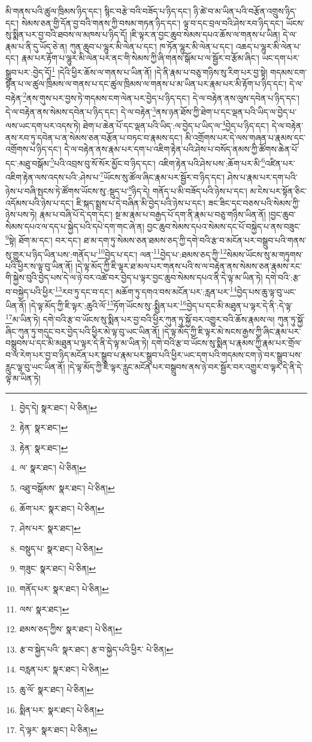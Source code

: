 མི་གནས་པའི་ཚུལ་ཁྲིམས་ཉིད་དང་། སྙིང་བརྩེ་བའི་བཟོད་པ་ཉིད་དང་། ཉི་ཚེ་བ་མ་ཡིན་པའི་བརྩོན་འགྲུས་ཉིད་དང་། སེམས་ཅན་གྱི་དོན་བྱ་བའི་གནས་ཀྱི་བསམ་གཏན་ཉིད་དང་། ལྟ་བ་དང་བྲལ་བའི་ཤེས་རབ་ཉིད་དང་། ཡོངས་སུ་སྨིན་པར་བྱ་བའི་ཐབས་ལ་མཁས་པ་ཉིད་དོ། །ཇི་ལྟར་ན་བྱང་ཆུབ་སེམས་དཔའ་ཆོས་ལ་གནས་པ་ཡིན། དེ་ལ་རྣམ་པ་ནི་དུ་ཡོད་ཅེ་ན། ཀུན་ཆུབ་པ་ལྷུར་མི་ལེན་པ་དང་། ཁ་ཏོན་ལྷུར་མི་ལེན་པ་དང་། འཆད་པ་ལྷུར་མི་ལེན་པ་དང་། རྣམ་པར་རྟོག་པ་ལྷུར་མི་ལེན་པར་ནང་གི་སེམས་ཀྱི་ཞི་གནས་སྒོམ་པ་ལ་སྦྱོར་བ་རྩོམ་ཞིང་། ཡང་དག་པར་སྒྲུབ་པར་:བྱེད་དོ།\footnote{བྱེད་དེ།  སྣར་ཐང་།  པེ་ཅིན། } །དེའི་ཕྱིར་ཆོས་ལ་གནས་པ་ཡིན་ནོ། །དེ་ནི་རྣམ་པ་བཅུ་གཉིས་སུ་རིག་པར་བྱ་སྟེ། གདམས་ངག་སྟོན་པ་ལ་ཚུལ་ཁྲིམས་ལ་གནས་པ་དང་ཚུལ་ཁྲིམས་ལ་གནས་པ་མ་ཡིན་པར་རྣམ་པར་མི་རྟོག་པ་ཉིད་དང་། དེ་ལ་བརྟེན་\footnote{རྟེན་  སྣར་ཐང་། }ནས་གུས་པར་བྱས་ཏེ་གདམས་ངག་ལེན་པར་བྱེད་པ་ཉིད་དང་། དེ་ལ་བརྟེན་ནས་ལུས་དབེན་པ་ཉིད་དང་། དེ་ལ་བརྟེན་ནས་སེམས་དབེན་པ་ཉིད་དང་། དེ་ལ་བརྟེན་\footnote{རྟེན་  སྣར་ཐང་། }ནས་ཉན་ཐོས་ཀྱི་ཐེག་པ་དང་ལྡན་པའི་ཡིད་ལ་བྱེད་པ་ལས་ཡང་དག་པར་འདས་ཏེ། ཐེག་པ་ཆེན་པོ་དང་ལྡན་པའི་ཡིད་:ལ་བྱེད་པ་ཡིད་ལ་\footnote{ལ་  སྣར་ཐང་།  པེ་ཅིན། }བྱེད་པ་ཉིད་དང་། དེ་ལ་བརྟེན་ནས་རབ་ཏུ་དབེན་པ་ན་སེམས་ཅན་བརྩོན་པ་བཏང་བ་རྣམས་དང་། མི་འགྲོགས་པར་དེ་ལས་གཞན་པ་རྣམས་དང་འགྲོགས་པ་ཉིད་དང་། དེ་ལ་བརྟེན་ནས་རྣམ་པར་དག་པ་འཇིག་རྟེན་པའི་ཤེས་པ་བསོད་ནམས་ཀྱི་ཚོགས་ཆེན་པོ་དང་:མཐུ་བསྒོམ་\footnote{འཐུ་བསྒོམས་  སྣར་ཐང་།  པེ་ཅིན། }པའི་འབྲས་བུ་སོ་སོར་མྱོང་བ་ཉིད་དང་། འཇིག་རྟེན་པའི་ཤེས་པས་:ཆོག་པར་མི་\footnote{ཆོག་པར་  སྣར་ཐང་།  པེ་ཅིན། }འཛིན་པར་འཇིག་རྟེན་ལས་འདས་པའི་:ཤེས་པ་\footnote{ཤེས་པར་  སྣར་ཐང་། }ཡོངས་སུ་ཚོལ་ཞིང་རྣམ་པར་སྦྱོར་བ་ཉིད་དང་། ཤེས་པ་རྣམ་པར་དག་པའི་ཉེས་པ་བཞི་སྤངས་ཏེ་ཚོགས་ཡོངས་སུ་:སྡུད་པ་\footnote{བསྡུད་པ་  སྣར་ཐང་།  པེ་ཅིན། }ཉིད་དེ། གནོད་པ་མི་བཟོད་པའི་ཉེས་པ་དང་། མ་ངེས་པར་སྟོན་ཅིང་འདོམས་པའི་ཉེས་པ་དང་། ཇི་སྐད་སྨྲས་པ་དེ་བཞིན་མི་བྱེད་པའི་ཉེས་པ་དང་། ཟང་ཟིང་དང་བཅས་པའི་སེམས་ཀྱི་ཉེས་པས་ཏེ། རྣམ་པ་བཞི་པོ་དེ་དག་དང་། སྔ་མ་རྣམ་པ་བརྒྱད་པོ་དག་ནི་རྣམ་པ་བཅུ་གཉིས་ཡིན་ནོ། །བྱང་ཆུབ་སེམས་དཔའ་ལ་དད་པ་སྐྱེད་པའི་དཔེ་དག་གང་ཞེ་ན། བྱང་ཆུབ་སེམས་དཔའ་སེམས་དང་པོ་བསྐྱེད་པ་ནས་བཟུང་\footnote{གཟུང་  སྣར་ཐང་།  པེ་ཅིན། }སྟེ། ཐོག་མ་དང་། བར་དང་། ཐ་མ་དག་ཏུ་སེམས་ཅན་ཐམས་ཅད་ཀྱི་དགེ་བའི་རྩ་བ་མངོན་པར་བསྒྲུབ་པའི་གནས་སུ་གྱུར་པ་ཉིད་ཡིན་པས་:གནོད་པ་\footnote{གནོད་པར་  སྣར་ཐང་།  པེ་ཅིན། }བྱེད་པ་དང་། ལན་\footnote{ལས་  སྣར་ཐང་། }བྱེད་པ་:ཐམས་ཅད་ཀྱི་\footnote{ཐམས་ཅད་ཀྱིས་  སྣར་ཐང་།  པེ་ཅིན། }སེམས་ཡོངས་སུ་མ་གཏུགས་པའི་ཕྱིར་ས་ལྟ་བུ་ཡིན་ནོ། །དེ་ལྟ་མོད་ཀྱི་ཇི་ལྟར་ཐ་མལ་པར་གནས་པའི་ས་ལ་བརྟེན་ནས་སེམས་ཅན་རྣམས་རང་གི་སྐྱེས་བུའི་བྱེད་པས་དེ་ལ་ཉེ་བར་འཚེ་བར་བྱེད་པ་ལྟར་བྱང་ཆུབ་སེམས་དཔའ་ནི་དེ་ལྟ་མ་ཡིན་ཏེ། དགེ་བའི་:རྩ་བ་བསྐྱེད་པའི་ཕྱིར་\footnote{རྩ་བ་སྐྱེད་པའི་  སྣར་ཐང་། རྩ་བ་སྐྱེད་པའི་ཕྱིར་  པེ་ཅིན། }རབ་ཏུ་དང་བ་དང་། མཆོག་ཏུ་དགའ་བས་མངོན་པར་:རླན་པར་\footnote{བརླན་པར་  སྣར་ཐང་།  པེ་ཅིན། }བྱེད་པས་ཆུ་ལྟ་བུ་ཡང་ཡིན་ནོ། །དེ་ལྟ་མོད་ཀྱི་ཇི་ལྟར་:ཆུའི་ལོ་\footnote{ཆུ་ལོ་  སྣར་ཐང་།  པེ་ཅིན། }ཏོག་ཡོངས་སུ་:སྨྱིན་པར་\footnote{སྨིན་པར་  སྣར་ཐང་།  པེ་ཅིན། }བྱེད་པ་དང་མི་མཐུན་པ་ལྟར་དེ་ནི་:དེ་ལྟ་\footnote{དེ་ལྟར་  སྣར་ཐང་།  པེ་ཅིན། }མ་ཡིན་ཏེ། དགེ་བའི་རྩ་བ་ཡོངས་སུ་སྨིན་པར་བྱ་བའི་ཕྱིར་ཀུན་ཏུ་སྐྱོ་བར་འགྱུར་བའི་ཆོས་རྣམས་ལ། ཀུན་ཏུ་སྐྱོ་ཞིང་ཀུན་ཏུ་གདུང་བར་བྱེད་པའི་ཕྱིར་མེ་ལྟ་བུ་ཡང་ཡིན་ནོ། །དེ་ལྟ་མོད་ཀྱི་ཇི་ལྟར་མེ་སངས་རྒྱས་ཀྱི་ཞིང་རྣམ་པར་བསྒྲུབས་པ་དང་མི་མཐུན་པ་ལྟར་དེ་ནི་དེ་ལྟ་མ་ཡིན་ཏེ། དགེ་བའི་རྩ་བ་ཡོངས་སུ་སྨིན་པ་རྣམས་ཀྱི་རྣམ་པར་གྲོལ་བ་ལ་རེག་པར་བྱ་བ་ཉིད་མངོན་པར་སྒྲུབ་པ་རྣམ་པར་སྒྲུབ་པའི་ཕྱིར་ཡང་དག་པའི་གདམས་ངག་ཉེ་བར་སྒྲུབ་པས་རླུང་ལྟ་བུ་ཡང་ཡིན་ནོ། །དེ་ལྟ་མོད་ཀྱི་ཇི་ལྟར་རླུང་མངོན་པར་བསྒྲུབས་ནས་ཉེ་བར་སྦྱོར་བར་འགྱུར་བ་ལྟར་དེ་ནི་དེ་ལྟ་མ་ཡིན་ཏེ། 